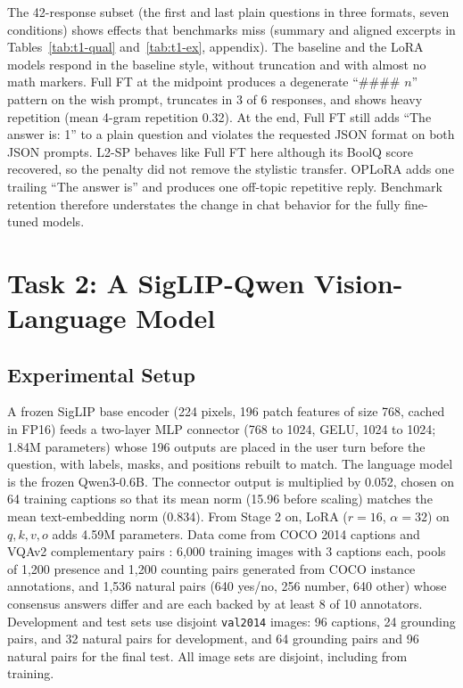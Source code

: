 \documentclass{article}
\begin{document}
The 42-response subset (the first and last plain questions in three formats, seven conditions) shows effects that benchmarks miss (summary and aligned excerpts in Tables~\ref{tab:t1-qual} and~\ref{tab:t1-ex}, appendix). The baseline and the LoRA models respond in the baseline style, without truncation and with almost no math markers. Full FT at the midpoint produces a degenerate ``\#\#\#\# $n$'' pattern on the wish prompt, truncates in 3 of 6 responses, and shows heavy repetition (mean 4-gram repetition 0.32). At the end, Full FT still adds ``The answer is: 1'' to a plain question and violates the requested JSON format on both JSON prompts. L2-SP behaves like Full FT here although its BoolQ score recovered, so the penalty did not remove the stylistic transfer. OPLoRA adds one trailing ``The answer is'' and produces one off-topic repetitive reply. Benchmark retention therefore understates the change in chat behavior for the fully fine-tuned models.

\section{Task 2: A SigLIP-Qwen Vision-Language Model}
\subsection{Experimental Setup}
A frozen SigLIP base encoder \citep{zhai2023siglip} (224 pixels, 196 patch features of size 768, cached in FP16) feeds a two-layer MLP connector \citep{liu2023llava} (768 to 1024, GELU, 1024 to 1024; 1.84M parameters) whose 196 outputs are placed in the user turn before the question, with labels, masks, and positions rebuilt to match. The language model is the frozen Qwen3-0.6B. The connector output is multiplied by 0.052, chosen on 64 training captions so that its mean norm (15.96 before scaling) matches the mean text-embedding norm (0.834). From Stage 2 on, LoRA ($r=16$, $\alpha=32$) on $q,k,v,o$ adds 4.59M parameters. Data come from COCO 2014 captions \citep{lin2014coco} and VQAv2 complementary pairs \citep{goyal2017vqa}: 6,000 training images with 3 captions each, pools of 1,200 presence and 1,200 counting pairs generated from COCO instance annotations, and 1,536 natural pairs (640 yes/no, 256 number, 640 other) whose consensus answers differ and are each backed by at least 8 of 10 annotators. Development and test sets use disjoint \texttt{val2014} images: 96 captions, 24 grounding pairs, and 32 natural pairs for development, and 64 grounding pairs and 96 natural pairs for the final test. All image sets are disjoint, including from training.
\end{document}
